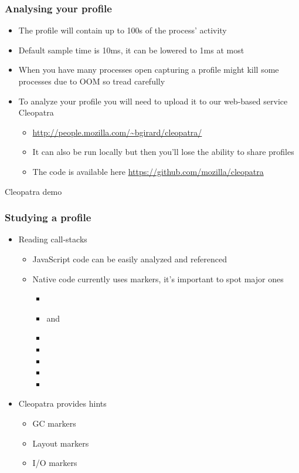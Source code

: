 \begin{frame}
 \frametitle{Analysing your profile}
 \begin{itemize}
  \item The profile will contain up to 100s of the process' activity
  \item Default sample time is 10ms, it can be lowered to 1ms at most
  \item When you have many processes open capturing a profile might kill some
        processes due to OOM so tread carefully
  \item To analyze your profile you will need to upload it to our web-based service Cleopatra
  \begin{itemize}
   \item \url{http://people.mozilla.com/~bgirard/cleopatra/}
   \item It can also be run locally but then you'll lose the ability to share profiles
   \item The code is available here \url{https://github.com/mozilla/cleopatra}
  \end{itemize}
 \end{itemize}
\end{frame}

\begin{frame}
 \begin{center}
  \Huge{Cleopatra demo}
 \end{center}
\end{frame}

\begin{frame}
 \frametitle{Studying a profile}
 \begin{itemize}
  \item Reading call-stacks
  \begin{itemize}
   \item JavaScript code can be easily analyzed and referenced
   \item Native code currently uses markers, it's important to spot major ones
   \begin{itemize}
    \item {}
    \item {} and 
    \item {}
    \item {}
    \item {}
    \item {}
    \item {}
   \end{itemize}
  \end{itemize}
  \item Cleopatra provides hints
   \begin{itemize}
    \item GC markers
    \item Layout markers
    \item I/O markers
   \end{itemize}
 \end{itemize}
\end{frame}

